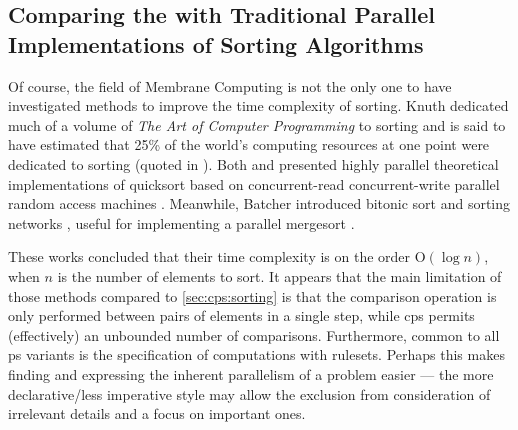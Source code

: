 
\subsection{Comparing the   with Traditional Parallel Implementations of Sorting Algorithms}

Of course, the field of Membrane Computing is not the only one to have investigated methods to improve the time complexity of sorting.  Knuth dedicated much of a volume of \textit{The Art of Computer Programming} to sorting \cite{Knuth1998} and is said to have estimated that 25\% of the world's computing resources at one point were dedicated to sorting (quoted in \cite{Powers1991}).  Both \citeauthor{Powers1991} \cite{Powers1991} and \citeauthor{Chlebus1991} \cite{Chlebus1991} presented highly parallel theoretical implementations of quicksort based on concurrent-read concurrent-write parallel random access machines \cite{JaJa2011}.  Meanwhile, Batcher introduced bitonic sort and sorting networks \cite{Akl2011}, useful for implementing a parallel mergesort \cite{Lee1995}.

These works concluded that their time complexity is on the order O\((\log n)\), when \(n\) is the number of elements to sort.  It appears that the main limitation of those methods compared to \cref{sec:cps:sorting} is that the comparison operation is only performed between pairs of elements in a single step, while \gls{cps} permits (effectively) an unbounded number of comparisons.  Furthermore, common to all \gls{ps} variants is the specification of computations with \glspl{ruleset}.  Perhaps this makes finding and expressing the inherent parallelism of a problem easier --- the more declarative/less imperative style may allow the exclusion from consideration of irrelevant details and a focus on important ones.